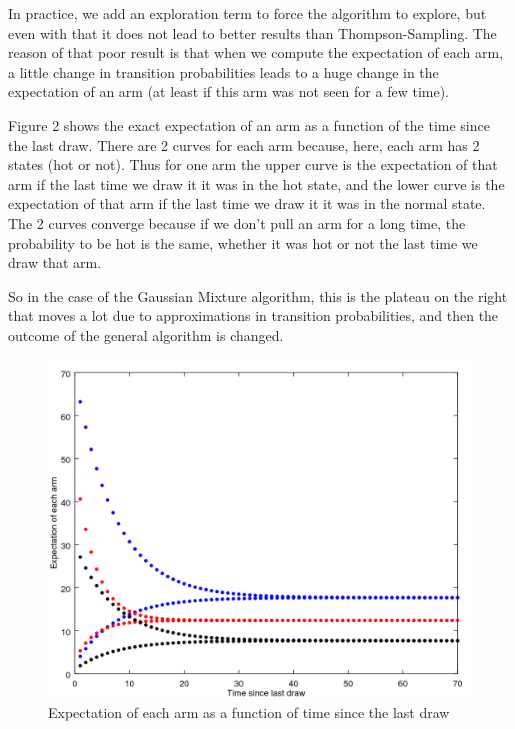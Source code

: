 \documentclass{article} %
\begin{document}
In practice, we add an exploration term to force the algorithm to explore, but even with that it does not lead to better results than Thompson-Sampling. The reason of that poor result is that when we compute the expectation of each arm, a little change in transition probabilities leads to a huge change in the expectation of an arm (at least if this arm was not seen for a few time).

Figure 2 shows the exact expectation of an arm as a function of the time since the last draw. There are 2 curves for each arm because, here, each arm has 2 states (hot or not). Thus for one arm the upper curve is the expectation of that arm if the last time we draw it it was in the hot state, and the lower curve is the expectation of that arm if the last time we draw it it was in the normal state. The 2 curves converge because if we don't pull an arm for a long time, the probability to be hot is the same, whether it was hot or not the last time we draw that arm.

So in the case of the Gaussian Mixture algorithm, this is the plateau on the right that moves a lot due to approximations in transition probabilities, and then the outcome of the general algorithm is changed.

\begin{figure}[h]
	\begin{center}
		\includegraphics[width=1.0\textwidth]{expectations.png}
	\end{center}
	\caption{Expectation of each arm as a function of time since the last draw}
\end{figure}
\end{document}
